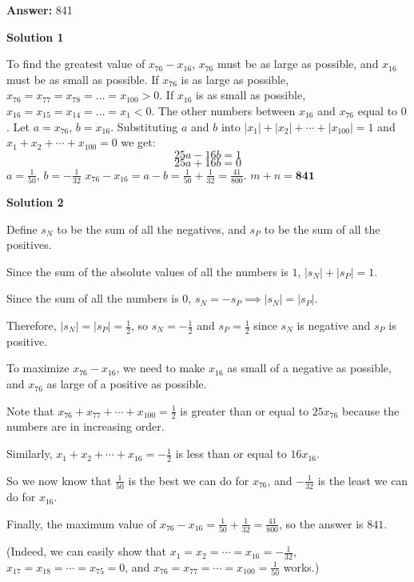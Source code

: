 \begin{enumerate}
 
 \textbf{Answer: }841



\textbf{Solution 1}

To find the greatest value of $x_{76} - x_{16}$, $x_{76}$ must be as large as possible, and $x_{16}$ must be as small as possible. If $x_{76}$ is as large as possible, $x_{76} = x_{77} = x_{78} = \dots = x_{100} > 0$. If $x_{16}$ is as small as possible, $x_{16} = x_{15} = x_{14} = \dots = x_{1} < 0$. The other numbers between $x_{16}$ and $x_{76}$ equal to $0$. Let $a = x_{76}$, $b = x_{16}$. Substituting $a$ and $b$ into $|x_1| + |x_2| + \cdots + |x_{100}| = 1$ and $x_1 + x_2 + \cdots + x_{100} = 0$ we get:
 \[25a - 16b = 1\]
 \[25a + 16b = 0\]$a = \frac{1}{50}$, $b = -\frac{1}{32}$
$x_{76} - x_{16} = a - b = \frac{1}{50} + \frac{1}{32} = \frac{41}{800}$. $m+n = \boxed{\textbf{841}}$




\textbf{Solution 2}

Define $s_N$ to be the sum of all the negatives, and $s_P$ to be the sum of all the positives.

 Since the sum of the absolute values of all the numbers is $1$, $|s_N|+|s_P|=1$.

 Since the sum of all the numbers is $0$, $s_N=-s_P\implies |s_N|=|s_P|$.

 Therefore, $|s_N|=|s_P|=\frac 12$, so $s_N=-\frac 12$ and $s_P=\frac 12$ since $s_N$ is negative and $s_P$ is positive.

 To maximize $x_{76}-x_{16}$, we need to make $x_{16}$ as small of a negative as possible, and $x_{76}$ as large of a positive as possible.

 Note that $x_{76}+x_{77}+\cdots+x_{100}=\frac 12$ is greater than or equal to $25x_{76}$ because the numbers are in increasing order.

 Similarly, $x_{1}+x_{2}+\cdots+x_{16}=-\frac 12$ is less than or equal to $16x_{16}$.

 So we now know that $\frac 1{50}$ is the best we can do for $x_{76}$, and $-\frac 1{32}$ is the least we can do for $x_{16}$.

 Finally, the maximum value of $x_{76}-x_{16}=\frac 1{50}+\frac 1{32}=\frac{41}{800}$, so the answer is $\boxed{841}$.

 (Indeed, we can easily show that $x_1=x_2=\cdots=x_{16}=-\frac 1{32}$, $x_{17}=x_{18}=\cdots=x_{75}=0$, and $x_{76}=x_{77}=\cdots=x_{100}=\frac 1{50}$ works.)

 




\end{enumerate}
